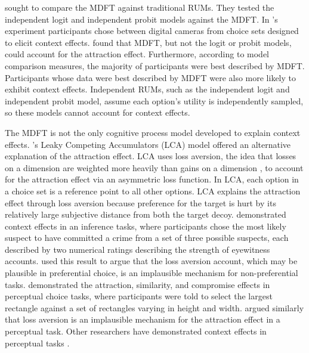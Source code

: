 \textcite{berkowitschRigorouslyTestingMultialternative2014b} sought to compare the MDFT against traditional RUMs. They tested the independent logit and independent probit models against the MDFT. In \textcite{berkowitschRigorouslyTestingMultialternative2014b}'s experiment participants chose between digital cameras from choice sets designed to elicit context effects. \textcite{berkowitschRigorouslyTestingMultialternative2014b} found that MDFT, but not the logit or probit models, could account for the attraction effect. Furthermore, according to model comparison measures, the majority of participants were best described by MDFT. Participants whose data were best described by MDFT were also more likely to exhibit context effects. Independent RUMs, such as the independent logit and independent probit model, assume each option's utility is independently sampled, so these models cannot account for context effects. 

The MDFT is not the only cognitive process model developed to explain context effects. \textcite{usherLossAversionInhibition2004a}'s Leaky Competing Accumulators (LCA) model offered an alternative explanation of the attraction effect. LCA uses loss aversion, the idea that losses on a dimension are weighted more heavily than gains on a dimension \parencite{tverskyAdvancesProspectTheorya}, to account for the attraction effect via an asymmetric loss function. In LCA, each option in a choice set is a reference point to all other options. LCA explains the attraction effect through loss aversion because preference for the target is hurt by its relatively large subjective distance from both the target decoy. \textcite{truebloodMultialternativeContextEffects2012} demonstrated context effects in an inference tasks, where participants chose the most likely suspect to have committed a crime from a set of three possible suspects, each described by two numerical ratings describing the strength of eyewitness accounts. \textcite{truebloodMultialternativeContextEffects2012} used this result to argue that the loss aversion account, which may be plausible in preferential choice, is an implausible mechanism for non-preferential tasks. \textcite{trueblood2013not} demonstrated the attraction, similarity, and compromise effects in perceptual choice tasks, where participants were told to select the largest rectangle against a set of rectangles varying in height and width. \textcite{trueblood2013not} argued similarly that loss aversion is an implausible mechanism for the attraction effect in a perceptual task. Other researchers have demonstrated context effects in perceptual tasks \parencite{choplinComparisoninducedDecoyEffects2005b,yearsleyContextEffectsSimilarity2022,liaoInfluenceDistanceDecoy2021,spektorWhenGoodLooks2018b,spektorRepulsionEffectPreferential2022}. 


